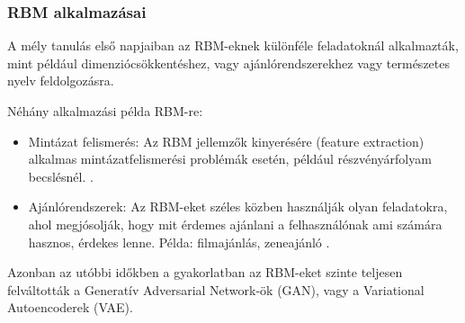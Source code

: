 \subsubsection{RBM alkalmazásai}

A mély tanulás első napjaiban az RBM-eknek különféle feladatoknál alkalmazták, mint például dimenziócsökkentéshez, vagy ajánlórendszerekhez vagy természetes nyelv feldolgozásra. 

\noindent
Néhány alkalmazási példa RBM-re:
\begin{itemize}
	\item Mintázat felismerés: Az RBM jellemzők kinyerésére (feature extraction) alkalmas mintázatfelismerési problémák esetén, például részvényárfolyam becslésnél. \cite{cai2012feature}.
	\item Ajánlórendszerek: Az RBM-eket széles közben használják olyan feladatokra, ahol megjósolják, hogy mit érdemes ajánlani a felhasználónak ami számára hasznos, érdekes lenne. Példa: filmajánlás, zeneajánló \cite{liu2014content}.
\end{itemize}

Azonban az utóbbi időkben a gyakorlatban az RBM-eket szinte teljesen felváltották a Generatív Adversarial Network-ök (GAN), vagy a Variational Autoencoderek (VAE).



